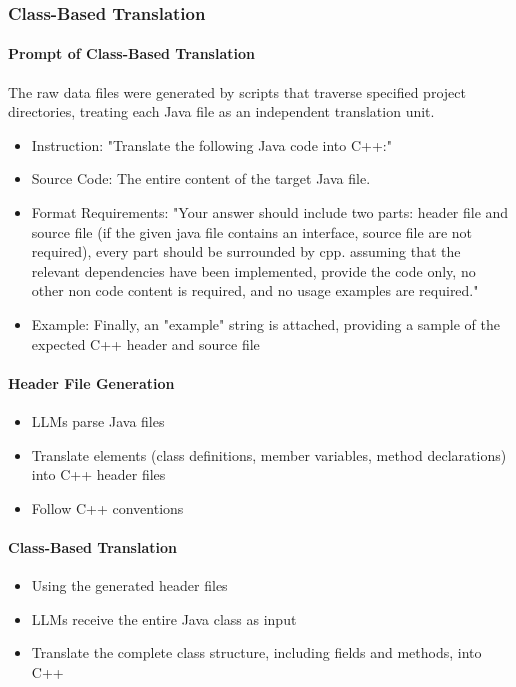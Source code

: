 \subsubsection{Class-Based Translation}

\paragraph{Prompt of Class-Based Translation}
The raw data files were generated by scripts that traverse specified project directories, treating each Java file as an independent translation unit.

\begin{itemize}
    \item Instruction: "Translate the following Java code into C++:"
    \item Source Code: The entire content of the target Java file.
    \item Format Requirements: "Your answer should include two parts: header file and source file (if the given java file contains an interface, source file are not required), every part should be surrounded by cpp. assuming that the relevant dependencies have been implemented, provide the code only, no other non code content is required, and no usage examples are required."
    \item Example: Finally, an "example" string is attached, providing a sample of the expected C++ header and source file
\end{itemize}

\paragraph{Header File Generation}
\begin{itemize}
    \item LLMs parse Java files
    \item Translate elements (class definitions, member variables, method declarations) into C++ header files
    \item Follow C++ conventions
\end{itemize}

\paragraph{Class-Based Translation}
\begin{itemize}
    \item Using the generated header files
    \item LLMs receive the entire Java class as input
    \item Translate the complete class structure, including fields and methods, into C++
\end{itemize}

